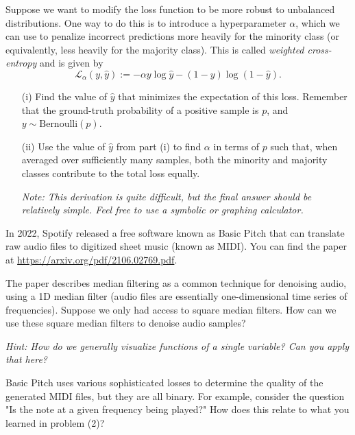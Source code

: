 \documentclass[11pt]{article}
\begin{document}
\begin{subparts}
        \subpart Suppose we want to modify the loss function to be more robust to unbalanced distributions. One way to do this is to introduce a hyperparameter $\alpha$, which we can use to penalize incorrect predictions more heavily for the minority class (or equivalently, less heavily for the majority class). This is called \emph{weighted cross-entropy} and is given by
        $$
        \mathcal{L}_\alpha(y, \hat{y}) := - \alpha y \log \hat{y} - (1 - y) \log (1 - \hat{y}).
        $$
        \begin{enumerate}
            \item[(i)] Find the value of $\hat{y}$ that minimizes the expectation of this loss. Remember that the ground-truth probability of a positive sample is $p$, and $y \sim \text{Bernoulli}(p)$.
            
            
            \item[(ii)] Use the value of $\hat{y}$ from part (i) to find $\alpha$ in terms of $p$ such that, when averaged over sufficiently many samples, both the minority and majority classes contribute to the total loss equally.
            
            \emph{Note: This derivation is quite difficult, but the final answer should be relatively simple. Feel free to use a symbolic or graphing calculator.}
            
        \end{enumerate}
    \end{subparts}

    \newpage
        In 2022, Spotify released a free software known as Basic Pitch that can translate raw audio files to digitized sheet music (known as MIDI). You can find the paper at \url{https://arxiv.org/pdf/2106.02769.pdf}.
        \begin{subparts}
            \subpart The paper describes median filtering as a common technique for denoising audio, using a 1D median filter (audio files are essentially one-dimensional time series of frequencies). Suppose we only had access to square median filters. How can we use these square median filters to denoise audio samples?

            \emph{Hint: How do we generally visualize functions of a single variable? Can you apply that here?}

            \subpart Basic Pitch uses various sophisticated losses to determine the quality of the generated MIDI files, but they are all binary. For example, consider the question "Is the note at a given frequency being played?" How does this relate to what you learned in problem (2)?
            
        \end{subparts}
\end{document}
